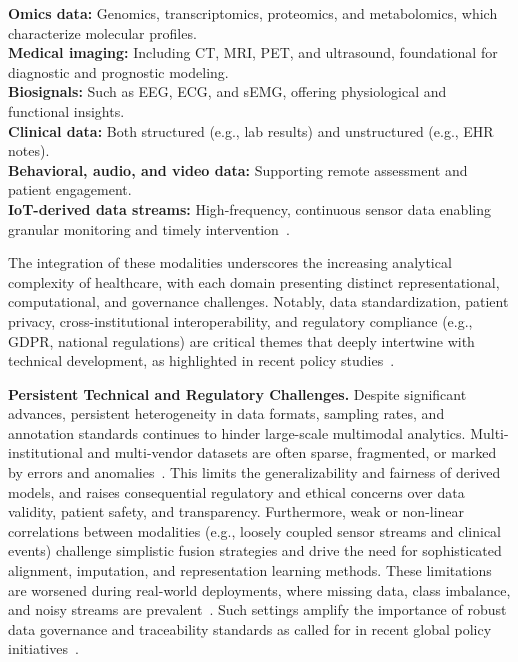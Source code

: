 \documentclass[sigconf]{acmart}
\begin{document}
\noindent\textbf{Omics data:} Genomics, transcriptomics, proteomics, and metabolomics, which characterize molecular profiles.
\\
\textbf{Medical imaging:} Including CT, MRI, PET, and ultrasound, foundational for diagnostic and prognostic modeling.
\\
\textbf{Biosignals:} Such as EEG, ECG, and sEMG, offering physiological and functional insights.
\\
\textbf{Clinical data:} Both structured (e.g., lab results) and unstructured (e.g., EHR notes).
\\
\textbf{Behavioral, audio, and video data:} Supporting remote assessment and patient engagement.
\\
\textbf{IoT-derived data streams:} High-frequency, continuous sensor data enabling granular monitoring and timely intervention~\cite{ref35,ref42,ref46,ref50,ref54,ref55,ref61,ref62,ref64,ref65,ref89,ref90,ref106}.

The integration of these modalities underscores the increasing analytical complexity of healthcare, with each domain presenting distinct representational, computational, and governance challenges. Notably, data standardization, patient privacy, cross-institutional interoperability, and regulatory compliance (e.g., GDPR, national regulations) are critical themes that deeply intertwine with technical development, as highlighted in recent policy studies~\cite{ref82,ref84,ref70}.

\vspace{1ex}
\noindent\textbf{Persistent Technical and Regulatory Challenges.} Despite significant advances, persistent heterogeneity in data formats, sampling rates, and annotation standards continues to hinder large-scale multimodal analytics. Multi-institutional and multi-vendor datasets are often sparse, fragmented, or marked by errors and anomalies~\cite{ref82,ref83,ref84,ref90,ref106}. This limits the generalizability and fairness of derived models, and raises consequential regulatory and ethical concerns over data validity, patient safety, and transparency. Furthermore, weak or non-linear correlations between modalities (e.g., loosely coupled sensor streams and clinical events) challenge simplistic fusion strategies and drive the need for sophisticated alignment, imputation, and representation learning methods. These limitations are worsened during real-world deployments, where missing data, class imbalance, and noisy streams are prevalent~\cite{ref83,ref84,ref106}. Such settings amplify the importance of robust data governance and traceability standards as called for in recent global policy initiatives~\cite{ref82,ref84,ref70}.
\end{document}
